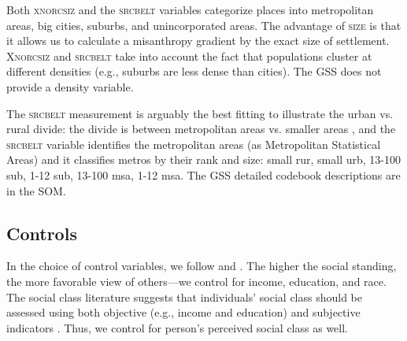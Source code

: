 \documentclass[11pt, letterpaper]{article}
\begin{document}
\begin{spacing}{1.4}
Both \textsc{xnorcsiz} and the \textsc{srcbelt} variables categorize places into metropolitan areas, big cities, suburbs, and  unincorporated areas. The advantage of \textsc{size} is that it allows us to calculate a misanthropy 
 gradient by the exact size of settlement. \textsc{Xnorcsiz} and \textsc{srcbelt} take into account the fact that populations cluster at different densities (e.g., suburbs are less dense than cities). The GSS does not provide a density variable. 

The \textsc{srcbelt} measurement is arguably the best fitting to illustrate the
urban vs. rural divide: the divide is between metropolitan areas vs. smaller areas
\citep{hansonCityJournalautumn15}, and the \textsc{srcbelt} variable identifies the
metropolitan areas (as Metropolitan Statistical Areas) and it classifies metros
by their rank and size: small rur, small urb, 13-100 sub, 1-12 sub, 13-100 msa, 1-12 msa. The GSS detailed codebook descriptions are in the SOM. 
   

\subsection*{Controls}

In the choice of control variables, we follow \citet{welch07} and  \citet{smith97}.
The higher the social standing, the more favorable view of others---we
control for income, education, and race. The social class literature suggests that
individuals' social class should be assessed  using both objective (e.g.,
income and education) and subjective indicators \citep[e.g.,][]{kraus09}. %
Thus, we control for person's perceived social class as well. 


\end{spacing}
\end{document}
